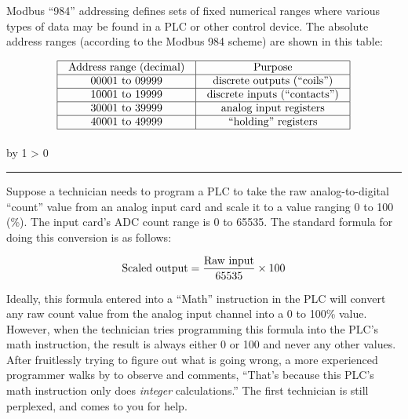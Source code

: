 \documentclass[12pt,a4paper]{article}
\def\oppgave{
            \advance\questnum by 1
            \ifnum \questnum > 0
                 \hrule
                 \vskip 3pt
                 \leftline{Oppgave \the\questnum}
                 \vskip 3pt \fi}
\begin{document}
\vskip 10pt

Modbus ``984'' addressing defines sets of fixed numerical ranges where various types of data may be found in a PLC or other control device.  The absolute address ranges (according to the Modbus 984 scheme) are shown in this table: 


$$\vbox{\offinterlineskip
\halign{\strut
\vrule \quad\hfil # \ \hfil & 
\vrule \quad\hfil # \ \hfil \vrule \cr
\noalign{\hrule}
%
Address range (decimal) & Purpose \cr
%
\noalign{\hrule}
%
00001 to 09999 & discrete outputs (``coils'') \cr
%
\noalign{\hrule}
%
10001 to 19999 & discrete inputs (``contacts'') \cr
%
\noalign{\hrule}
%
30001 to 39999 & analog input registers \cr
%
\noalign{\hrule}
%
40001 to 49999 & ``holding'' registers \cr
%
\noalign{\hrule}
} %
}$$ %



\vfil \eject 



\oppgave{} 

Suppose a technician needs to program a PLC to take the raw analog-to-digital ``count'' value from an analog input card and scale it to a value ranging 0 to 100 (\%).  The input card's ADC count range is 0 to 65535.  The standard formula for doing this conversion is as follows:

$$\hbox{Scaled output} = {\hbox{Raw input} \over 65535} \times 100$$

Ideally, this formula entered into a ``Math'' instruction in the PLC will convert any raw count value from the analog input channel into a 0 to 100\% value.  However, when the technician tries programming this formula into the PLC's math instruction, the result is always either 0 or 100 and never any other values.  After fruitlessly trying to figure out what is going wrong, a more experienced programmer walks by to observe and comments, ``That's because this PLC's math instruction only does {\it integer} calculations.''  The first technician is still perplexed, and comes to you for help.  
\end{document}
